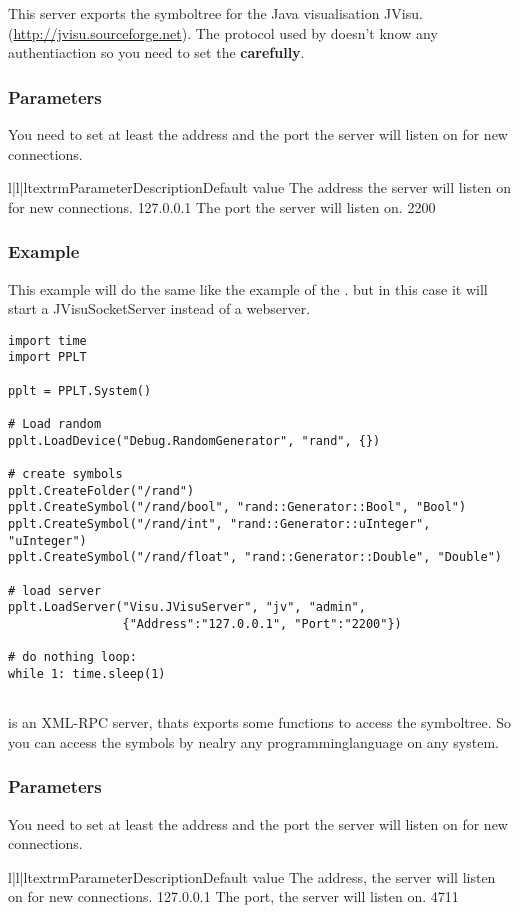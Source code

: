 This server exports the symboltree for the Java visualisation JVisu. 
(\url{http://jvisu.sourceforge.net}). The protocol used by  
doesn't know any authentiaction so you need to set the 
\textbf{carefully}.

\subsubsection{Parameters}
You need to set at least the address and the port the server will listen on 
for new connections.

\begin{tableiii}{l|l|l}{textrm}{Parameter}{Description}{Default value}
        {The address the server will listen on for new connections.}
        {127.0.0.1}
        {The port the server will listen on.}
        {2200}
\end{tableiii}        

\subsubsection{Example}
This example will do the same like the example of the 
. but in this case it will start a 
JVisuSocketServer instead of a webserver.
\begin{verbatim}
import time
import PPLT

pplt = PPLT.System()

# Load random
pplt.LoadDevice("Debug.RandomGenerator", "rand", {})

# create symbols
pplt.CreateFolder("/rand")
pplt.CreateSymbol("/rand/bool", "rand::Generator::Bool", "Bool")
pplt.CreateSymbol("/rand/int", "rand::Generator::uInteger", "uInteger")
pplt.CreateSymbol("/rand/float", "rand::Generator::Double", "Double")

# load server
pplt.LoadServer("Visu.JVisuServer", "jv", "admin", 
                {"Address":"127.0.0.1", "Port":"2200"})

# do nothing loop:
while 1: time.sleep(1)
    
\end{verbatim}


 is an XML-RPC server, thats exports some functions 
to access the symboltree. So you can access the symbols by nealry any 
programminglanguage on any system. 

\subsubsection{Parameters}
You need to set at least the address and the port the server will listen on 
for new connections. 
\begin{tableiii}{l|l|l}{textrm}{Parameter}{Description}{Default value}
        {The address, the server will listen on for new connections.}
        {127.0.0.1}
        {The port, the server will listen on.}
        {4711}
\end{tableiii}        

